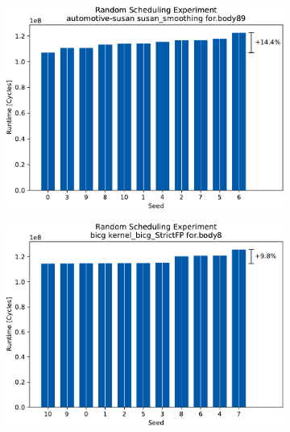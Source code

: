 \begin{figure}
\begin{subfigure}{0.45\textwidth}
        \caption{}
        \label{fig:eval:rndm:aurora:b}
    \end{subfigure}
    \begin{subfigure}{0.45\textwidth}
        \includegraphics[width=\textwidth]{img/random-scheduling-experiment-aurora-collected/automotive-susan-crop.pdf}
        \caption{}
        \label{fig:eval:rndm:aurora:c}
    \end{subfigure}
    \hfill
    \begin{subfigure}{0.45\textwidth}
        \includegraphics[width=\textwidth]{img/random-scheduling-experiment-aurora-collected/bicg-crop.pdf}
        \caption{}
        \label{fig:eval:rndm:aurora:d}
    \end{subfigure}
    \begin{subfigure}{0.45\textwidth}

\end{subfigure}
\end{figure}
